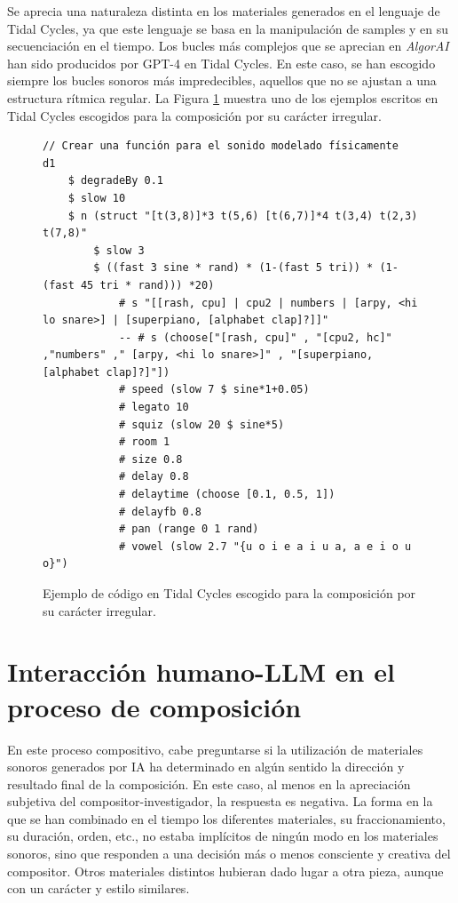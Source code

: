 Se aprecia una naturaleza distinta en los materiales generados en el lenguaje de Tidal Cycles, ya que este lenguaje se basa en la manipulación de samples y en su secuenciación en el tiempo. Los bucles más complejos que se aprecian en \textit{AlgorAI} han sido producidos por GPT-4 en Tidal Cycles. En este caso, se han escogido siempre los bucles sonoros más impredecibles, aquellos que no se ajustan a una estructura rítmica regular. La Figura \ref{fig:ejemplo_tidal_irregular} muestra uno de los ejemplos escritos en Tidal Cycles escogidos para la composición por su carácter irregular.


\begin{figure}[H]
    \caption[Ejemplo de código en Tidal Cycles escogido para la composición por su carácter irregular.]{Ejemplo de código en Tidal Cycles escogido para la composición por su carácter irregular.}
    \centering
    \begin{lstlisting}[style=SuperCollider-IDE, basicstyle=\footnotesize\ttfamily, numbers=none]
// Crear una función para el sonido modelado físicamente
d1 
    $ degradeBy 0.1
    $ slow 10 
    $ n (struct "[t(3,8)]*3 t(5,6) [t(6,7)]*4 t(3,4) t(2,3) t(7,8)"
        $ slow 3 
        $ ((fast 3 sine * rand) * (1-(fast 5 tri)) * (1-(fast 45 tri * rand))) *20) 
            # s "[[rash, cpu] | cpu2 | numbers | [arpy, <hi lo snare>] | [superpiano, [alphabet clap]?]]" 
            -- # s (choose["[rash, cpu]" , "[cpu2, hc]" ,"numbers" ," [arpy, <hi lo snare>]" , "[superpiano, [alphabet clap]?]"])
            # speed (slow 7 $ sine*1+0.05) 
            # legato 10
            # squiz (slow 20 $ sine*5)
            # room 1
            # size 0.8
            # delay 0.8
            # delaytime (choose [0.1, 0.5, 1])
            # delayfb 0.8
            # pan (range 0 1 rand)
            # vowel (slow 2.7 "{u o i e a i u a, a e i o u o}")
    \end{lstlisting}
    \label{fig:ejemplo_tidal_irregular}
\end{figure}

\section{Interacción humano-LLM en el proceso de composición}

En este proceso compositivo, cabe preguntarse si la utilización de materiales sonoros generados por IA ha determinado en algún sentido la dirección y resultado final de la composición. En este caso, al menos en la apreciación subjetiva del compositor-investigador, la respuesta es negativa. La forma en la que se han combinado en el tiempo los diferentes materiales, su fraccionamiento, su duración, orden, etc., no estaba implícitos de ningún modo en los materiales sonoros, sino que responden a una decisión más o menos consciente y creativa del compositor. Otros materiales distintos hubieran dado lugar a otra pieza, aunque con un carácter y estilo similares. 

